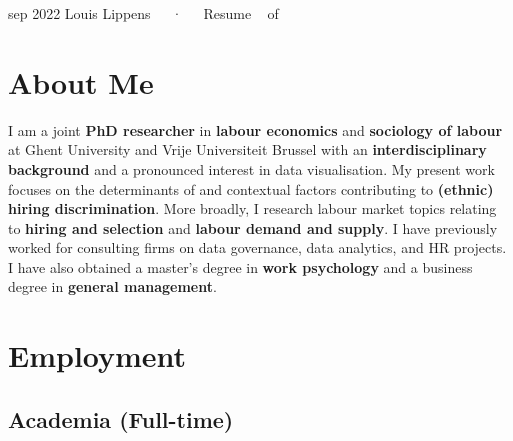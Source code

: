 \documentclass[11pt,a4paper,]{awesome-cv}
\begin{document}
\makecvheader

\makecvfooter
  {sep 2022}
    {Louis Lippens~~~·~~~Resume}
  {\thepage~ of \pageref{LastPage}~}





\hypertarget{about-me}{%
\section{About Me}\label{about-me}}

\footnotesize

I am a joint \textbf{PhD researcher} in \textbf{labour economics} and
\textbf{sociology of labour} at Ghent University and Vrije Universiteit
Brussel with an \textbf{interdisciplinary background} and a pronounced
interest in data visualisation. My present work focuses on the
determinants of and contextual factors contributing to \textbf{(ethnic)
hiring discrimination}. More broadly, I research labour market topics
relating to \textbf{hiring and selection} and \textbf{labour demand and
supply}. I have previously worked for consulting firms on data
governance, data analytics, and HR projects. I have also obtained a
master's degree in \textbf{work psychology} and a business degree in
\textbf{general management}. \normalsize

\hypertarget{employment}{%
\section{Employment}\label{employment}}

\medskip

\hypertarget{academia-full-time}{%
\subsection{Academia (Full-time)}\label{academia-full-time}}
\end{document}
